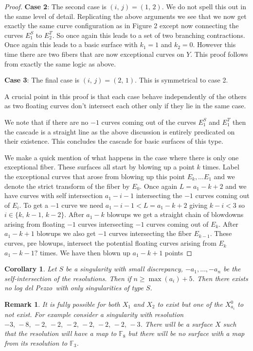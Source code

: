 \documentclass[11pt]{amsbook}
\theoremstyle{plain}
\newtheorem{cor}[thm]{Corollary}
\newtheorem*{rem}{Remark}
\newcommand{\ldp}{log del Pezzo}
\newcommand{\mb}[1]{\mathbb{#1}}
\begin{document}
\begin{proof}
\textbf{Case 2}: The second case is $(i, \, j) = (1, \, 2)$. We do not spell this out in the same level of detail. Replicating the above arguments we see that we now get exactly the same curve configuration as in Figure 2 except now connecting the curves $E_1^S$ to $E_2^T$. So once again this leads to a set of two branching contractions. Once again this leads to a basic surface with $k_1 = 1$ and $k_2 = 0$. However this time there are two fibers that are now exceptional curves on $Y$. This proof follows from exactly the same logic as above.

\textbf{Case 3}: The final case is $(i, \, j) = (2, \, 1)$. This is symmetrical to case 2.

A crucial point in this proof is that each case behave independently of the others as two floating curves don't intersect each other only if they lie in the same case.

We note that if there are no $-1$ curves coming out of the curves $E_1^S$ and $E_1^T$ then the cascade is a straight line as the above discussion is entirely predicated on their existence. This concludes the cascade for basic surfaces of this type. 

We make a quick mention of what happens in the case where there is only one exceptional fiber. These surfaces all start by blowing up a point $k$ times. Label the exceptional curves that arose from blowing up this point $E_{k}, \dots E_1$ and we denote the strict transform of the fiber by $E_{0}$. Once again $L = a_1 -k+ 2$ and we have curves with self intersection $a_1 - i -1$ intersecting the $-1$ curves coming out of $E_i$. To get a $-1$ curve we need $a_1 - i - 1 < L = a_1 - k+2$ giving $k-i < 3$ so $i \in \{ k, \, k-1,\, k-2 \}$.  After $a_1-k$ blowups we get a straight chain of blowdowns arising from floating $-1$ curves intersecting $-1$ curves coming out of $E_k$. After $a_1-k+1$ blowups we also get $-1$ curves intersecting the fiber $E_{k-1}$. These curves, pre blowups, intersect the potential floating curves arising from $E_k$ $a_1 - k - 1?$ times. We have then blown up $a_1-k+1$ points 


\end{proof}
\begin{cor}
Let $S$ be a singularity with small discrepancy, $-a_1, \dots , -a_n$ be the self-intersection of the resolutions. Then if $n \geq \max (a_i) + 5 $. Then there exists no \ldp\ with only singularities of type $S$.
\end{cor}
\begin{rem}
It is fully possible for both $X_1$ and $X_2$ to exist but one of the $X_{a_i}^0$ to not exist. For example consider a singularity with resolution $-3, \, -8, \, -2, \, -2, \, -2, \, -2, \, -2, \, -2, \, -3$. There will be a surface $X$ such that the resolution will have a map to $\mb{F}_8$ but there will be no surface with a map from its resolution to $\mb{F}_3$.
\end{rem}
\end{document}
